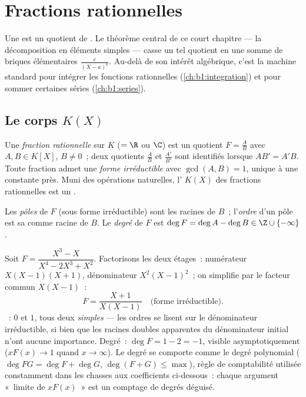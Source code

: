 \chapter{Fractions rationnelles}\label{ch:b1:fractions}

Une  est un quotient de . Le théorème
central de ce court chapitre --- la décomposition en éléments
simples --- casse un tel
quotient en une somme de briques élémentaires $\frac{c}{(X - a)^k}$.
Au-delà de son intérêt algébrique, c'est la machine standard pour
intégrer les fonctions rationnelles (\cref{ch:b1:integration}) et pour
sommer certaines séries (\cref{ch:b1:series}).

\section{Le corps $K(X)$}

\begin{definition}\label{def:b1:fractions:field}
Une \emph{fraction rationnelle} sur $K$ ($=
\R$ ou $\C$) est un quotient $F = \frac{A}{B}$ avec $A, B \in K[X]$, $B
\neq 0$~; deux quotients $\frac AB$ et $\frac{A'}{B'}$ sont identifiés
lorsque $AB' = A'B$. Toute fraction admet une \emph{forme irréductible}
avec $\gcd(A, B) = 1$, unique à une constante près. Muni des opérations
naturelles, l' $K(X)$ des fractions rationnelles est un .

Les \emph{pôles} de $F$ (sous forme irréductible) sont les
racines de $B$~; l'\emph{ordre} d'un pôle est sa  comme
racine de $B$. Le \emph{degré} de $F$ est $\deg F = \deg A - \deg B \in
\Z \cup \{-\infty\}$.
\end{definition}

\begin{example}\label{ex:b1:fractions:vocab}
Soit $F = \dfrac{X^3 - X}{X^4 - 2X^3 + X^2}$. Factorisons les deux
étages~: numérateur $X(X-1)(X+1)$, dénominateur $X^2(X-1)^2$~; on
simplifie par le facteur commun $X(X-1)$~:
\[
F = \frac{X + 1}{X(X - 1)} \quad\text{(forme irréductible).}
\]
~: $0$ et $1$, tous deux \emph{simples} --- les ordres se lisent
sur le dénominateur irréductible, si bien que les racines doubles
apparentes du dénominateur initial n'ont aucune importance. Degré~:
$\deg F = 1 - 2 = -1$, visible asymptotiquement ($xF(x) \to 1$ quand $x
\to \infty$). Le degré se comporte comme le degré polynomial ($\deg FG
= \deg F + \deg G$, $\deg(F + G) \leq \max$), règle de comptabilité
utilisée constamment dans les chasses aux coefficients ci-dessous~:
chaque argument «~limite de $xF(x)$~» est un comptage de degrés
déguisé.
\end{example}

